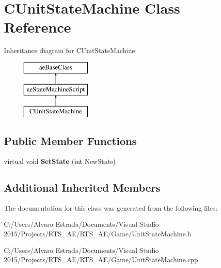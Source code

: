 \hypertarget{class_c_unit_state_machine}{}\section{C\+Unit\+State\+Machine Class Reference}
\label{class_c_unit_state_machine}
Inheritance diagram for C\+Unit\+State\+Machine\+:\begin{figure}[H]
\begin{center}
\leavevmode
\includegraphics[height=3.000000cm]{class_c_unit_state_machine}
\end{center}
\end{figure}
\subsection*{Public Member Functions}
\begin{DoxyCompactItemize}
\item 
virtual void {\bfseries Set\+State} (int New\+State)\hypertarget{class_c_unit_state_machine_a5fb01eee64b2eb11bfced9a614b12173}{}\label{class_c_unit_state_machine_a5fb01eee64b2eb11bfced9a614b12173}

\end{DoxyCompactItemize}
\subsection*{Additional Inherited Members}


The documentation for this class was generated from the following files\+:\begin{DoxyCompactItemize}
\item 
C\+:/\+Users/\+Alvaro Estrada/\+Documents/\+Visual Studio 2015/\+Projects/\+R\+T\+S\+\_\+\+A\+E/\+R\+T\+S\+\_\+\+A\+E/\+Game/Unit\+State\+Machine.\+h\item 
C\+:/\+Users/\+Alvaro Estrada/\+Documents/\+Visual Studio 2015/\+Projects/\+R\+T\+S\+\_\+\+A\+E/\+R\+T\+S\+\_\+\+A\+E/\+Game/Unit\+State\+Machine.\+cpp\end{DoxyCompactItemize}
